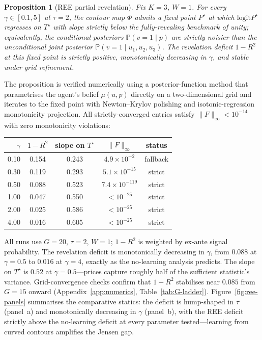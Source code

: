 \documentclass[12pt,letterpaper]{article}
\newtheorem{proposition}{Proposition}
\theoremstyle{definition}
\theoremstyle{remark}
\newcommand{\PP}{\mathbb{P}}
\newcommand{\logit}{\mathrm{logit}}
\newcommand{\Tstar}{T^{\!\star}}
\newcommand{\1}{\mathbf{1}}
\begin{document}
\begin{proposition}[REE partial revelation]\label{prop:ree}
Fix $K=3$, $W=1$. For every $\gamma\in[0.1,5]$ at $\tau=2$, the contour
map $\Phi$ admits a fixed point $P^{\star}$ at which $\logit P^{\star}$
regresses on $\Tstar$ with slope strictly below the fully-revealing
benchmark of unity; equivalently, the conditional posteriors
$\PP(v=1\mid p)$ are strictly noisier than the unconditional joint
posterior $\PP(v=1\mid u_{1},u_{2},u_{3})$. The revelation deficit
$1-R^{2}$ at this fixed point is strictly positive, monotonically
decreasing in $\gamma$, and stable under grid refinement.
\end{proposition}

The proposition is verified numerically using a posterior-function method
that parametrises the agent's belief $\mu(u,p)$ directly on a
two-dimensional grid and iterates to the fixed point with
Newton--Krylov polishing and isotonic-regression monotonicity
projection. All strictly-converged entries satisfy
$\|F\|_{\infty}<10^{-14}$ with zero monotonicity violations:
\begin{center}
\renewcommand{\arraystretch}{1.05}
\begin{tabular}{rcccc}
\toprule
$\gamma$ & $1-R^{2}$ & slope on $\Tstar$ & $\|F\|_\infty$ & status \\
\midrule
\rowcolor{black!15} 0.10 & 0.154 & 0.243 & $4.9\times 10^{-2}$ & fallback \\
\rowcolor{black!15} 0.30 & 0.119 & 0.293 & $5.1\times 10^{-15}$ & strict \\
0.50 & 0.088 & 0.523 & $7.4\times 10^{-119}$ & strict \\
1.00 & 0.047 & 0.550 & $<10^{-25}$ & strict \\
2.00 & 0.025 & 0.586 & $<10^{-25}$ & strict \\
4.00 & 0.016 & 0.605 & $<10^{-25}$ & strict \\
\bottomrule
\end{tabular}
\end{center}
All runs use $G=20$, $\tau=2$, $W=1$; $1\!-\!R^{2}$ is weighted by
ex-ante signal probability. The revelation deficit is
monotonically decreasing in $\gamma$, from $0.088$ at $\gamma=0.5$
to $0.016$ at $\gamma=4$, exactly as the no-learning analysis predicts.
The slope on $\Tstar$ is $0.52$ at $\gamma=0.5$---prices capture
roughly half of the sufficient statistic's variance. Grid-convergence
checks confirm that $1-R^{2}$ stabilises near $0.085$ from $G=15$
onward (Appendix~\ref{app:numerics}, Table~\ref{tab:G-ladder}).
Figure~\ref{fig:ree-panels} summarises the comparative statics: the
deficit is hump-shaped in $\tau$ (panel~a) and monotonically decreasing
in $\gamma$ (panel~b), with the REE deficit strictly above the
no-learning deficit at every parameter tested---learning from curved
contours amplifies the Jensen gap.
\end{document}
